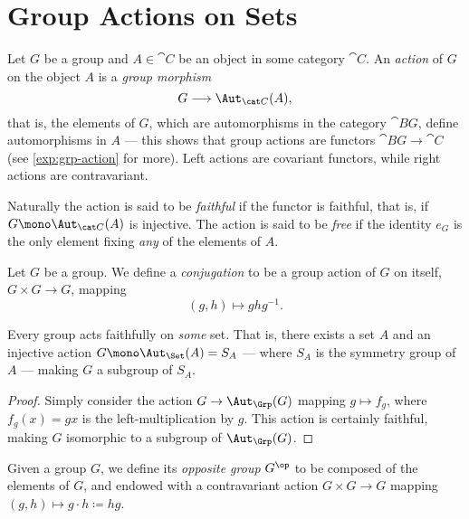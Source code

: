 \section{Group Actions on Sets}

\begin{definition}
\label{def:group-action}
Let \(G\) be a group and \(A \in \cat C\) be an object in some category
\(\cat C\). An \emph{action} of \(G\) on the object \(A\) is a \emph{group
  morphism}
\[
G \longrightarrow \Aut_{\cat C}(A),
\]
that is, the elements of \(G\), which are automorphisms in the category
\(\cat{B}G\), define automorphisms in \(A\) --- this shows that group actions
are functors \(\cat{B}G \to \cat C\) (see \cref{exp:grp-action} for more). Left
actions are covariant functors, while right actions are contravariant.

Naturally the action is said to be \emph{faithful} if the functor is faithful,
that is, if \(G \mono \Aut_{\cat C}(A)\) is injective. The action is said to be
\emph{free} if the identity \(e_G\) is the only element fixing \emph{any} of the
elements of \(A\).
\end{definition}

\begin{definition}[Conjugation]
\label{def:group-conjugation-action}
Let \(G\) be a group. We define a \emph{conjugation} to be a group action of
\(G\) on itself, \(G \times G \to G\), mapping
\[
(g, h) \longmapsto g h g^{-1}.
\]
\end{definition}

\begin{theorem}[Cayley]
\label{thm:cayley-faithful}
Every group acts faithfully on \emph{some} set. That is, there exists a set
\(A\) and an injective action \(G \mono \Aut_{\Set}(A) = S_A\) --- where \(S_A\)
is the symmetry group of \(A\) --- making \(G\) a subgroup of \(S_A\).
\end{theorem}

\begin{proof}
Simply consider the action \(G \to \Aut_{\Grp}(G)\) mapping \(g \mapsto f_g\),
where \(f_g(x) = g x\) is the left-multiplication by \(g\). This action is
certainly faithful, making \(G\) isomorphic to a subgroup of \(\Aut_{\Grp}(G)\).
\end{proof}

\begin{definition}
\label{def:opposite-group}
Given a group \(G\), we define its \emph{opposite group} \(G^{\op}\) to be
composed of the elements of \(G\), and endowed with a contravariant action \(G
\times G \to G\) mapping \((g, h) \mapsto g \cdot h \coloneq h g\).
\end{definition}

